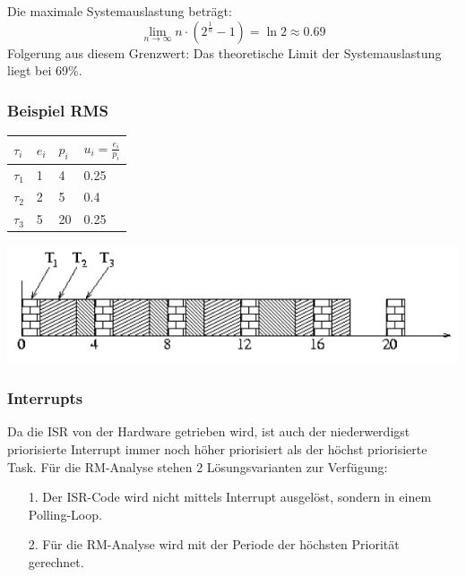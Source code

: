 Die maximale Systemauslastung beträgt: 
\begin{equation}
\lim_{n \to \infty}n\cdot(2^\frac{1}{n}-1) = \ln 2 \approx 0.69
\end{equation}
Folgerung aus diesem Grenzwert: Das theoretische Limit der Systemauslastung
liegt bei 69\%. 
\subsubsection{Beispiel RMS}
\begin{minipage}[t]{4 cm}
	\begin{tabular}{| l | l | l | l |}
		\hline
		$\tau_i$ & $e_i$ & $p_i$ & $u_i=\frac{e_i}{p_i}$ \\
		\hline
		$\tau_1$ & 1 & 4 & 0.25 \\
		\hline
		$\tau_2$ & 2 & 5 & 0.4 \\
		\hline
		$\tau_3$ & 5 & 20 & 0.25 \\
		\hline
	\end{tabular}
\end{minipage} 
\begin{minipage}[c]{14 cm}		
	\includegraphics[height=3.5cm]{images/RT/RMS}
\end{minipage}

\subsubsection{Interrupts}
Da die ISR von der Hardware getrieben wird, ist auch der niederwerdigst priorisierte Interrupt
immer noch höher priorisiert als der höchst priorisierte Task. Für die RM-Analyse stehen 2 Lösungsvarianten zur Verfügung:
\begin{itemize}
  \item[1.]  Der ISR-Code wird nicht mittels Interrupt ausgelöst, sondern in einem Polling-Loop.
  \item[2.]  Für die RM-Analyse wird mit der Periode der höchsten Priorität gerechnet.
\end{itemize}

